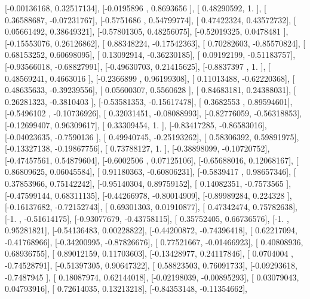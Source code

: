 \documentclass{article}
\begin{document}
       [-0.00136168,  0.32517134],
       [-0.0195896 ,  0.8693656 ],
       [ 0.48290592,  1.        ],
       [ 0.36588687, -0.07231767],
       [-0.5751686 ,  0.54799774],
       [ 0.47422324,  0.43572732],
       [ 0.05661492,  0.38649321],
       [-0.57801305,  0.48256075],
       [-0.52019325,  0.0478481 ],
       [-0.15553076,  0.26126862],
       [ 0.88348224, -0.17542363],
       [ 0.70282603, -0.85570824],
       [ 0.68153252,  0.60698095],
       [ 0.13092914, -0.36230185],
       [ 0.09192199, -0.51183757],
       [-0.93566018, -0.68827991],
       [-0.49630703,  0.21415625],
       [-0.8837397 ,  1.        ],
       [ 0.48569241,  0.4663016 ],
       [-0.2366899 ,  0.96199308],
       [ 0.11013488, -0.62220368],
       [ 0.48635633, -0.39239556],
       [ 0.05600307,  0.5560628 ],
       [ 0.84683181,  0.24388031],
       [ 0.26281323, -0.3810403 ],
       [-0.53581353, -0.15617478],
       [ 0.3682553 ,  0.89594601],
       [-0.5496102 , -0.10736926],
       [ 0.32031451, -0.08088993],
       [-0.82776059, -0.56318853],
       [-0.12699407,  0.96309617],
       [ 0.33309454,  1.        ],
       [-0.83417285, -0.86583016],
       [-0.04023635, -0.7590136 ],
       [ 0.49940745, -0.25193262],
       [ 0.58306392,  0.59891975],
       [-0.13327138, -0.19867756],
       [ 0.73788127,  1.        ],
       [-0.38898099, -0.10720752],
       [-0.47457561,  0.54879604],
       [-0.6002506 ,  0.07125106],
       [-0.65688016,  0.12068167],
       [ 0.86809625,  0.06045584],
       [ 0.91180363, -0.60806231],
       [-0.5839417 ,  0.98657346],
       [ 0.37853966,  0.75142242],
       [-0.95140304,  0.89759152],
       [ 0.14082351, -0.7573565 ],
       [-0.47599144,  0.68311135],
       [-0.44266978, -0.80014909],
       [-0.89989284,  0.224328  ],
       [-0.16137682, -0.72152743],
       [ 0.69301303,  0.01910877],
       [ 0.47342474,  0.75782638],
       [-1.        , -0.51614175],
       [-0.93077679, -0.43758115],
       [ 0.35752405,  0.66736576],
       [-1.        ,  0.95281821],
       [-0.54136483,  0.00228822],
       [-0.44200872, -0.74396418],
       [ 0.62217094, -0.41768966],
       [-0.34200995, -0.87826676],
       [ 0.77521667, -0.01466923],
       [ 0.40808936,  0.68936755],
       [ 0.89012159,  0.11703603],
       [-0.13428977,  0.24117846],
       [ 0.0704004 , -0.74528791],
       [-0.51397305,  0.90647322],
       [ 0.58823503,  0.76091733],
       [-0.09293618, -0.7487945 ],
       [ 0.18087974,  0.62144018],
       [-0.02198039, -0.00895293],
       [ 0.03079043,  0.04793916],
       [ 0.72614035,  0.13213218],
       [-0.84353148, -0.11354662],
\end{document}
